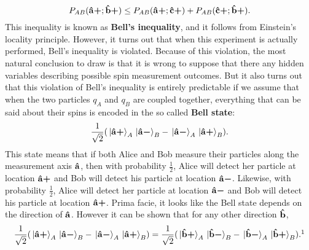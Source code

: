 \documentclass[letter, 12pt]{turabian-thesis}
\theoremstyle{hypothesis}
\newcommand{\uvb}[1]{\vb{\hat{{#1}}}}
\newcommand{\uvbp}[1]{\uvb{#1}\bm{+}}
\newcommand{\uvbm}[1]{\uvb{#1}\bm{-}}
\begin{document}
 \begin{equation}\label{bellinequality}
P_{AB}(\uvbp{a};\uvbp{b})\leq P_{AB}(\uvbp{a};\uvbp{c})+P_{AB}(\uvbp{c};\uvbp{b}).
\end{equation}
This inequality is known as \textbf{Bell's inequality}, and it follows from Einstein's locality principle.  However, it turns out that when this experiment is actually performed, Bell's inequality is violated. Because of this violation, the most natural conclusion to draw is that it is wrong to suppose that there any hidden variables describing possible spin measurement outcomes. But it also turns out that this violation of Bell's inequality is entirely predictable if we assume that when the two particles $q_A$ and $q_B$ are coupled together, everything that can be said about their spins is encoded in the so called \textbf{Bell state}: 
\begin{equation}\label{bell}
\frac{1}{\sqrt{2}}(\ket*{\uvbp{a}}_A\ket*{\uvbm{a}}_B-\ket*{\uvbm{a}}_A\ket*{\uvbp{a}}_B).\end{equation}
This state means that if both Alice and Bob measure their particles along the measurement axis $\uvb{a}$, then with probability $\frac{1}{2}$, Alice will detect her particle at location $\uvbp{a}$ and Bob will detect his particle at location $\uvbm{a}$. Likewise, with probability $\frac{1}{2}$, Alice will detect her particle at location $\uvbm{a}$ and Bob will detect his particle at location $\uvbp{a}$. Prima facie, it looks like the Bell state depends on the direction of $\uvb{a}$. However it can be shown that for any other direction $\uvb{b}$,
\begin{equation}\label{bellstate2}\frac{1}{\sqrt{2}}(\ket*{\uvbp{a}}_A\ket*{\uvbm{a}}_B-\ket*{\uvbm{a}}_A\ket*{\uvbp{a}}_B)=\frac{1}{\sqrt{2}}(\ket*{\uvbp{b}}_A\ket*{\uvbm{b}}_B-\ket*{\uvbm{b}}_A\ket*{\uvbp{b}}_B).\protect\footnotemark\end{equation}
\end{document}
